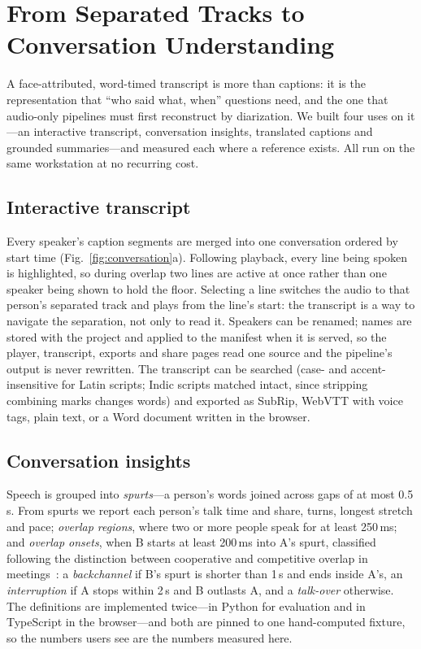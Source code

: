 \section{From Separated Tracks to Conversation Understanding}
\label{sec:conversation}

A face-attributed, word-timed transcript is more than captions: it is the representation that ``who said what, when'' questions need, and the one that audio-only pipelines must first reconstruct by diarization. We built four uses on it---an interactive transcript, conversation insights, translated captions and grounded summaries---and measured each where a reference exists. All run on the same workstation at no recurring cost.

\subsection{Interactive transcript}
Every speaker's caption segments are merged into one conversation ordered by start time (Fig.~\ref{fig:conversation}a). Following playback, every line being spoken is highlighted, so during overlap two lines are active at once rather than one speaker being shown to hold the floor. Selecting a line switches the audio to that person's separated track and plays from the line's start: the transcript is a way to navigate the separation, not only to read it. Speakers can be renamed; names are stored with the project and applied to the manifest when it is served, so the player, transcript, exports and share pages read one source and the pipeline's output is never rewritten. The transcript can be searched (case- and accent-insensitive for Latin scripts; Indic scripts matched intact, since stripping combining marks changes words) and exported as SubRip, WebVTT with voice tags, plain text, or a Word document written in the browser.

\subsection{Conversation insights}
Speech is grouped into \emph{spurts}---a person's words joined across gaps of at most 0.5\,s. From spurts we report each person's talk time and share, turns, longest stretch and pace; \emph{overlap regions}, where two or more people speak for at least 250\,ms; and \emph{overlap onsets}, when B starts at least 200\,ms into A's spurt, classified following the distinction between cooperative and competitive overlap in meetings~\cite{shriberg2001overlap}: a \emph{backchannel} if B's spurt is shorter than 1\,s and ends inside A's, an \emph{interruption} if A stops within 2\,s and B outlasts A, and a \emph{talk-over} otherwise. The definitions are implemented twice---in Python for evaluation and in TypeScript in the browser---and both are pinned to one hand-computed fixture, so the numbers users see are the numbers measured here.

